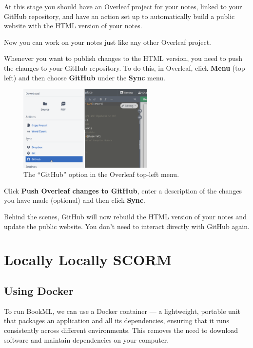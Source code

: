 At this stage you should have an Overleaf project for your notes, linked to your GitHub repository, and have an action set up to automatically build a public website with the HTML version of your notes.

Now you can work on your notes just like any other Overleaf project.

Whenever you want to publish changes to the HTML version, you need to push the changes to your GitHub repository. To do this, in Overleaf, click \textbf{Menu} (top left) and then choose \textbf{GitHub} under the \textbf{Sync} menu.

\begin{figure}[h]
    \centering
    \includegraphics[width=0.6\textwidth]{img/overleaf_sync.png}
    \caption{The ``GitHub'' option in the Overleaf top-left menu.}
    \label{fig:gh-overleaf-sync}
\end{figure}

Click \textbf{Push Overleaf changes to GitHub}, enter a description of the changes you have made (optional) and then click \textbf{Sync}.

Behind the scenes, GitHub will now rebuild the HTML version of your notes and update the public website. You don't need to interact directly with GitHub again.


\section{Locally \textrightarrow{} Locally \textrightarrow{} SCORM}

\subsection{Using Docker}
\label{ssec:docker}

To run BookML, we can use a Docker container --- a lightweight, portable unit that packages an application and all its dependencies, ensuring that it runs consistently across different environments. This removes the need to download software and maintain dependencies on your computer.

